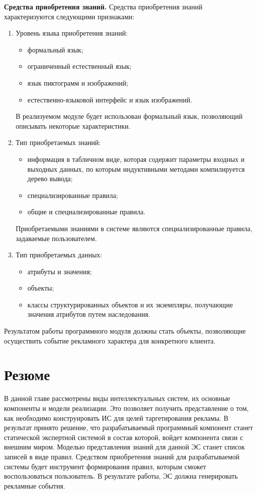 \textbf{Средства приобретения знаний.} Средства приобретения знаний характеризуются следующими признаками:

\begin{enumerate}
	\item Уровень языка приобретения знаний:
	\begin{itemize}
		\item формальный язык;
		\item ограниченный естественный язык;
		\item язык пиктограмм и изображений;
		\item естественно-языковой интерфейс и язык изображений. 
	\end{itemize}

	В реализуемом модуле будет использован формальный язык, позволяющий описывать некоторые характеристики.

	\item Тип приобретаемых знаний:
	\begin{itemize}
		\item информация в табличном виде, которая содержит параметры входных и выходных данных, по которым индуктивными методами компилируется дерево вывода;
		\item специализированные правила;
		\item общие и специализированные правила.
	\end{itemize}

	Приобретаемыми знаниями в системе являются специализированные правила, задаваемые пользователем.

	\item Тип приобретаемых данных:
	\begin{itemize}
		\item атрибуты и значения;
		\item объекты;
		\item классы структурированных объектов и их экземпляры, получающие значения атрибутов путем наследования.  
	\end{itemize}

\end{enumerate}

Результатом работы программного модуля должны стать объекты, позволяющие осуществить событие рекламного характера для конкретного клиента.

\section{Резюме}

В данной главе рассмотрены виды интеллектуальных систем, их основные компоненты и модели реализации. Это позволяет получить представление о том, как необходимо конструировать ИС для целей таргетирования рекламы. В результат принято решение, что разрабатываемый программный компонент станет статической экспертной системой в состав которой, войдет компонента связи с внешним миром. Моделью представления знаний для данной ЭС станет список записей в виде правил. Средством приобретения знаний для разрабатываемой системы будет инструмент формирования правил, которым сможет воспользоваться пользователь. В результате работы, ЭС должна генерировать рекламные события.